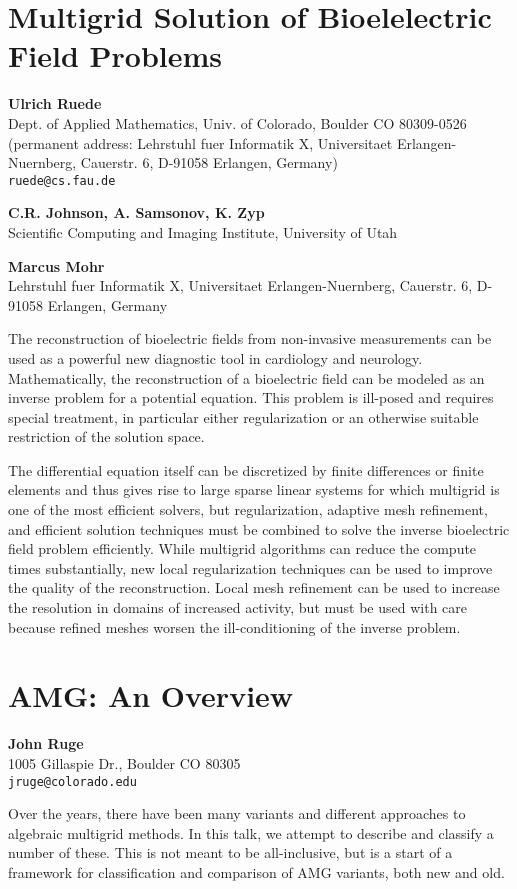 \documentclass[11pt]{article}
\newcommand{\nextab}[4]{
	\section{#2}
	{\bf #1} \\ \nopagebreak
	{#3} \\ \nopagebreak
	{\tt #4} \nopagebreak
	}
\begin{document}
\nextab
{Ulrich Ruede}
{Multigrid Solution of Bioelelectric Field Problems}
{Dept. of Applied Mathematics, Univ. of Colorado, Boulder CO 80309-0526
\\ (permanent address:
Lehrstuhl fuer Informatik X,
Universitaet Erlangen-Nuernberg,
Cauerstr. 6,
D-91058 Erlangen, Germany)}
{ruede@cs.fau.de}

{\bf C.R. Johnson, A. Samsonov, K. Zyp} \\
Scientific Computing and Imaging Institute, University of Utah

{\bf Marcus Mohr} \\
Lehrstuhl fuer Informatik X, Universitaet Erlangen-Nuernberg, Cauerstr. 6, D-91058 Erlangen, Germany


The reconstruction of bioelectric fields from non-invasive measurements
can be used as a powerful new diagnostic tool in cardiology and neurology.
Mathematically, the reconstruction of a bioelectric field can be modeled
as an inverse problem for a potential equation. This problem is ill-posed
and requires special treatment, in particular either regularization or an
otherwise suitable restriction of the solution space.


The differential equation itself can be discretized by finite differences or
finite elements and thus gives rise to large sparse linear systems for
which multigrid is one of the most efficient solvers, but regularization,
adaptive mesh refinement, and efficient solution techniques must be
combined to solve the inverse bioelectric field problem efficiently.
While
multigrid algorithms can reduce the compute times substantially, new local
regularization techniques can be used to improve the quality of the
reconstruction. Local mesh refinement can be used to increase the
resolution in domains of increased activity, but must be used with care
because refined meshes worsen the ill-conditioning of the inverse problem.




\nextab
{John Ruge}
{AMG: An Overview}
{1005 Gillaspie Dr., Boulder CO  80305}
{jruge@colorado.edu}

Over the years, there have been many variants and different approaches
to algebraic multigrid methods. In this talk, we attempt to describe
and classify a number of these. This is not meant to be all-inclusive,
but is a start of a framework for classification and comparison of
AMG variants, both new and old.
\end{document}
